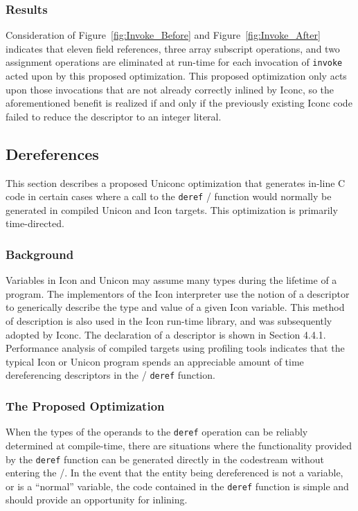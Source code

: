 \subsubsection{Results}

Consideration of Figure~\ref{fig:Invoke_Before} and
Figure~\ref{fig:Invoke_After} indicates that eleven field references, three
array subscript operations, and two assignment operations are eliminated at
\mbox{run-time} for each invocation of \texttt{invoke} acted upon by this
proposed optimization. This proposed optimization only acts upon those
invocations that are not already correctly inlined by Iconc, so the
aforementioned benefit is realized if and only if the previously existing
Iconc code failed to reduce the descriptor to an integer literal. 

\subsection{Dereferences}
\label{sect:deref_inlining_opt}
This section describes a proposed Uniconc optimization that generates in-line C
code in certain cases where a call to the \texttt{deref} \Rtl/ function would
normally be generated in compiled Unicon and Icon targets. This optimization is
primarily time-directed.

\subsubsection{Background}

Variables in Icon and Unicon may assume many types during the lifetime
of a program. The implementors of the Icon interpreter use the notion
of a descriptor to generically describe the type and value of a given
Icon variable. This method of description is also used in the Icon
\mbox{run-time} library, and was subsequently adopted by Iconc. The
declaration of a descriptor is shown in Section 4.4.1.  Performance
analysis of compiled targets using profiling tools indicates that the
typical Icon or Unicon program spends an appreciable amount of time
dereferencing descriptors in the \Rtl/ \texttt{deref} function.

\subsubsection{The Proposed Optimization}

When the types of the operands to the \texttt{deref} operation can be
reliably determined at \mbox{compile-time}, there are situations where
the functionality provided by the \texttt{deref} function can be
generated directly in the codestream without entering the \Rtl/. In
the event that the entity being dereferenced is not a variable, or is
a ``normal'' variable, the code contained in the \texttt{deref}
function is simple and should provide an opportunity for inlining.

